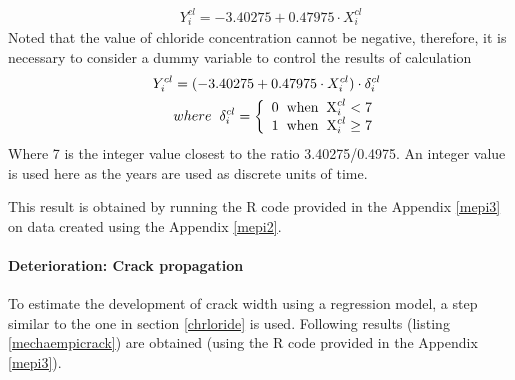 \begin{eqnarray}
 && Y_i^{cl} =  - 3.40275 + 0.47975 \cdot X_i^{cl} \label{eq3225}
\end{eqnarray}
Noted that the value of chloride concentration cannot be negative, therefore, it is necessary to consider a dummy variable to control the results of calculation
\begin{eqnarray}
 && Y_i^{cl} = ( - 3.40275 + 0.47975 \cdot X_i^{cl}) \cdot \delta _i^{cl} \label{eq3226}\\
 && where{\rm{\hspace{2mm} }}\delta _i^{cl} = \left\{ {\begin{array}{*{20}{c}}
{0{\rm{\hspace{2mm}   when \hspace{2mm} X}}_i^{cl} < 7}\\
{1{\rm{\hspace{2mm}   when \hspace{2mm}  X}}_i^{cl} \ge 7{\rm{ }}}
\end{array}} \right.
\end{eqnarray}
Where 7 is the integer value closest to the ratio 3.40275/0.4975. An integer value is used here as the years are used as discrete units of time. 

This result is obtained by running the R code provided in the Appendix \ref{mepi3} on data created using the Appendix \ref{mepi2}.
%
\paragraph{Deterioration: Crack propagation}
To estimate the development of crack width using a regression model, a step similar to the one in section \ref{chrloride} is used. Following results (listing \ref{mechaempicrack}) are obtained (using the R code provided in the Appendix \ref{mepi3}).



